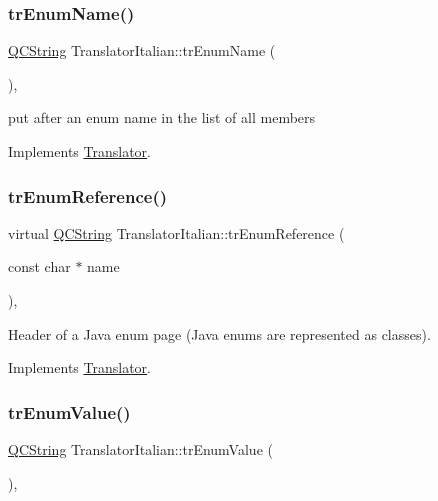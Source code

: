 \mbox{\label{class_translator_italian_af11ce97e00cee2962714f3aafe65464d}} 
\subsubsection{\texorpdfstring{trEnumName()}{trEnumName()}}
{\footnotesize\ttfamily \mbox{\hyperlink{class_q_c_string}{Q\+C\+String}} Translator\+Italian\+::tr\+Enum\+Name (\begin{DoxyParamCaption}{ }\end{DoxyParamCaption})\hspace{0.3cm}{\ttfamily [inline]}, {\ttfamily [virtual]}}

put after an enum name in the list of all members 

Implements \mbox{\hyperlink{class_translator}{Translator}}.

\mbox{\label{class_translator_italian_a861e5aa87281c24e9d65e69734901e8d}} 
\subsubsection{\texorpdfstring{trEnumReference()}{trEnumReference()}}
{\footnotesize\ttfamily virtual \mbox{\hyperlink{class_q_c_string}{Q\+C\+String}} Translator\+Italian\+::tr\+Enum\+Reference (\begin{DoxyParamCaption}\item[{const char $\ast$}]{name }\end{DoxyParamCaption})\hspace{0.3cm}{\ttfamily [inline]}, {\ttfamily [virtual]}}

Header of a Java enum page (Java enums are represented as classes). 

Implements \mbox{\hyperlink{class_translator}{Translator}}.

\mbox{\label{class_translator_italian_ac29baf0cffb2425dafd6203b18b9ede7}} 
\subsubsection{\texorpdfstring{trEnumValue()}{trEnumValue()}}
{\footnotesize\ttfamily \mbox{\hyperlink{class_q_c_string}{Q\+C\+String}} Translator\+Italian\+::tr\+Enum\+Value (\begin{DoxyParamCaption}{ }\end{DoxyParamCaption})\hspace{0.3cm}{\ttfamily [inline]}, {\ttfamily [virtual]}}

